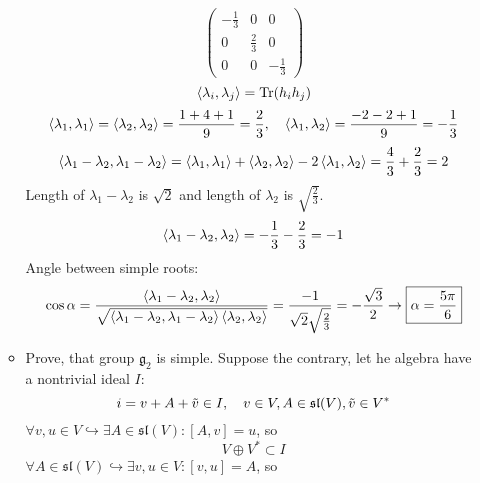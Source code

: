 \documentclass[12pt]{article}
\theoremstyle{definition}
\begin{document}
\begin{enumerate}
\begin{itemize}
\begin{equation}
\begin{pmatrix}
                -\frac{1}{3} & 0 & 0\\
                0 & \frac{2}{3} & 0\\
                0 & 0 & -\frac{1}{3}
            \end{pmatrix}
        \end{equation}
        \begin{equation}
            \braket{\lambda_i,\lambda_j}=\text{Tr}(h_ih_j)
        \end{equation}
        \begin{equation}
            \braket{\lambda_1,\lambda_1}=\braket{\lambda_2,\lambda_2}=\frac{1+4+1}{9}=\frac{2}{3},\quad\braket{\lambda_1,\lambda_2}=\frac{-2-2+1}{9}=-\frac{1}{3}
        \end{equation}
        \begin{equation}
            \braket{\lambda_1-\lambda_2,\lambda_1-\lambda_2}=\braket{\lambda_1,\lambda_1}+\braket{\lambda_2,\lambda_2}-2\braket{\lambda_1,\lambda_2}=\frac{4}{3}+\frac{2}{3}=2
        \end{equation}
        Length of $\lambda_1-\lambda_2$ is $\sqrt{2}$ and length of $\lambda_2$ is $\sqrt{\frac{2}{3}}$.
        \begin{equation}
            \braket{\lambda_1-\lambda_2,\lambda_2}=-\frac{1}{3}-\frac{2}{3}=-1
        \end{equation}
        Angle between simple roots:
        \begin{equation}
            \cos\alpha=\frac{\braket{\lambda_1-\lambda_2,\lambda_2}}{\sqrt{\braket{\lambda_1-\lambda_2,\lambda_1-\lambda_2}\braket{\lambda_2,\lambda_2}}}=\frac{-1}{\sqrt{2}\sqrt{\frac{2}{3}}}=-\frac{\sqrt{3}}{2}\rightarrow\boxed{\alpha=\frac{5\pi}{6}}
        \end{equation}
        \item Prove, that group $\mathfrak{g}_2$ is simple. Suppose the contrary, let he algebra have a nontrivial ideal $I$:
        \begin{equation}
            i=v+A+\Tilde{v}\in I,\quad v\in V, A\in\mathfrak{sl}(V),\tilde{v}\in V^*
        \end{equation}
        $\forall v,u\in V\hookrightarrow\exists A\in\mathfrak{sl}(V):[A,v]=u$, so
        \begin{equation}
            V\oplus V^*\subset I
        \end{equation}
        $\forall A\in \mathfrak{sl}(V)\hookrightarrow\exists v,u\in V:[v,u]=A$, so
        \begin{equation}

\end{equation}
\end{itemize}
\end{enumerate}
\end{document}
